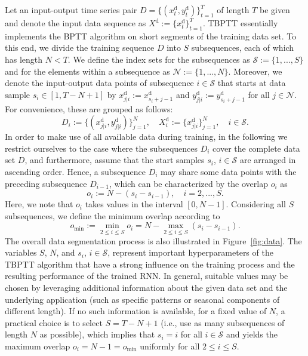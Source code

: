\documentclass{article} %
\begin{document}
{Let an input-output time series pair $D = \{({x}_{t}^\mathrm{d},{y}_{t}^\mathrm{d})\}_{t=1}^T$ of length $T$ be given and denote the input data sequence as $X^\mathrm{d} := \{x^\mathrm{d}_t\}_{t=1}^T$.}
{TBPTT essentially implements the BPTT algorithm on short segments of the training data set.
To this end, we divide the training sequence $D$ into $S$ subsequences, each of which has length $N<T$.}
We define the index sets for the subsequences as $\mathcal{S} := \{1,...,S\}$ and for the elements within a subsequence as $\mathcal{N}:=\{1,...,N\}$.
Moreover, we denote the input-output data points of subsequence $i\in\mathcal{S}$ that starts at data sample $s_i\in[1,T-N+1]$ by ${x}_{j|i}^\mathrm{d} := x_{s_i+j-1}^\mathrm{d}$ and ${y}_{j|i}^\mathrm{d} := y_{s_i+j-1}^\mathrm{d}$ for all $j\in\mathcal{N}$.
For convenience, these are grouped as follows:
\begin{equation}\label{eq:Di}
	D_i := \{({x}_{j|i}^\mathrm{d},{y}_{j|i}^\mathrm{d})\}_{j=1}^N, \quad X_i^\mathrm{d} := \{x^\mathrm{d}_{j|i}\}_{j=1}^N, \quad i \in \mathcal{S}.
\end{equation}
In order to make use of all available data during training, in the following we restrict ourselves to the case where the subsequences $D_i$ cover the complete data set $D$, and furthermore, assume that the start samples $s_i$, $i\in\mathcal{S}$ are arranged in ascending order.
Hence, a subsequence $D_i$ may share some data points with the preceding subsequence $D_{i-1}$, which can be characterized by the overlap $o_i$ as
\begin{equation}\label{eq:overlap_i}
	o_i := N-(s_i-s_{i-1}), \quad i=2,...,S.
\end{equation}
Here, we note that $o_i$ takes values in the interval $[0,N-1]$.
Considering all $S$ subsequences, we define the minimum overlap according to
\begin{equation}\label{eq:overlap_min}
	o_{\min} := \min_{2\leq i \leq S} o_i = N-\max_{2\leq i \leq S}(s_i-s_{i-1}).
\end{equation}
The overall data segmentation process is also illustrated in Figure~\ref{fig:data}. The variables $S$, $N$, and $s_i$, $i\in\mathcal{S}$, represent important hyperparameters of the TBPTT algorithm that have a strong influence on the training process and the resulting performance of the trained RNN. In general, suitable values may be chosen by leveraging additional information about the given data set and the underlying application (such as specific patterns or seasonal components of different length).
If no such information is available, for a fixed value of $N$, a practical choice is to select $S=T-N+1$ (i.e., use as many subsequences of length $N$ as possible), which implies that $s_i = i$ for all $i\in\mathcal{S}$ and yields the maximum overlap $o_i = N-1 = o_{\min}$ uniformly for all $2\leq i \leq S$.
\end{document}
